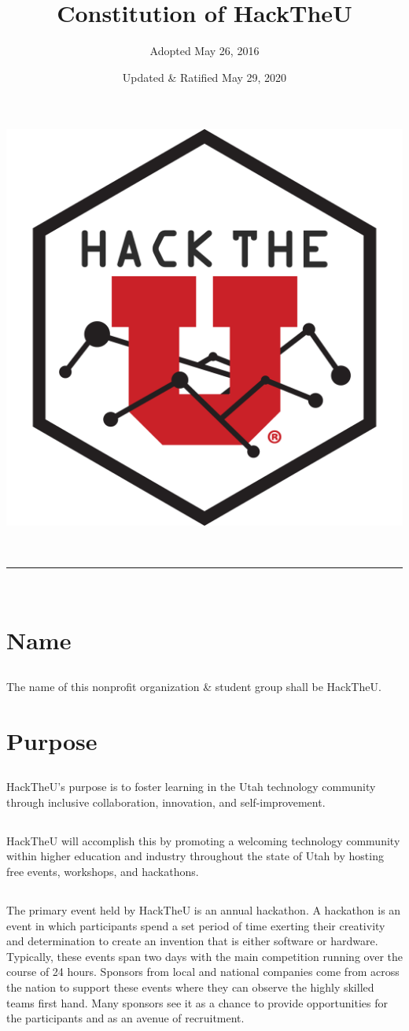 \documentclass[12pt]{article}
\title{Constitution of HackTheU}
\author{Adopted May 26, 2016}
\date{Updated \& Ratified May 29, 2020}
\makeatletter
\newcommand{\linia}{\rule{\linewidth}{0.5pt}}
\renewcommand{\maketitle}{
\begin{center}
\vspace{2ex}
{\huge \textsc{\@title}}
\vspace{1ex}
\\
\linia\\
\@author \hfill \@date
\vspace{4ex}
\end{center}
}
\makeatother
\begin{document}
\begin{center}
\includegraphics[width=.3\linewidth]{emblem}
\end{center}

\maketitle

\section{Name}

\subsection{}
The name of this nonprofit organization \& student group shall be HackTheU.

\section{Purpose}

\subsection{} HackTheU's purpose is to foster learning in the Utah technology community through inclusive collaboration, innovation, and self-improvement.

\subsection{} HackTheU will accomplish this by promoting a welcoming technology community 
within higher education and industry throughout the state of Utah 
by hosting free events, workshops, and hackathons.

\subsection{} The primary event held by HackTheU is an annual hackathon.
A hackathon is an event in which participants spend a set period of time exerting their creativity and determination to create an invention that is either software or hardware.
Typically, these events span two days with the main competition running over the course of 24 hours.
Sponsors from local and national companies come from across the nation to support these events
where they can observe the highly skilled teams first hand.
Many sponsors see it as a chance to provide opportunities for the participants and as an avenue of recruitment.
\end{document}
